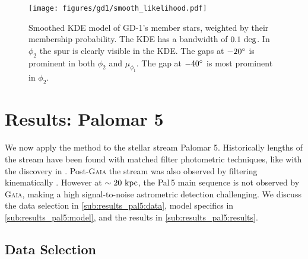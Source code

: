 \documentclass[twocolumn]{aastex631}
\newcommand{\code}[1]{\textsc{#1}}
\newcommand{\package}[1]{\code{#1}}
\newcommand{\stream}[1]{#1}
\begin{document}
        \begin{figure}[h]
            \centering
            \hspace{-25  pt}\texttt{[image: figures/gd1/smooth\_likelihood.pdf]}
            \caption{%
                Smoothed KDE model of \stream{GD-1}'s member stars, weighted by
                their membership probability. The KDE has a bandwidth of $0.1 \
                \rm{deg}$.  In $\phi_2$ the spur is clearly visible in the KDE.
                The gaps at $-20\degree$ is prominent in both $\phi_2$ and
                $\mu_{\phi_1}$.  The gap at $-40\degree$ is most prominent in
                $\phi_2$.
            }
            \label{fig:gd1-heatmap}
        \end{figure}



\section{Results: Palomar 5} \label{sec:results_pal5}

    We now apply the method to the stellar stream \stream{Palomar 5}.
    Historically lengths of the stream have been found with matched filter
    photometric techniques, like with the discovery in \citet{Odenkirchen+2001}.
    Post-\package{Gaia} the stream was also observed by filtering kinematically
    \cite[e.g.,][]{Starkman+2019, Ibata+2021}.  However at $\sim 20 \ \rm{kpc}$,
    the \stream{Pal\,5} main sequence is not observed by \package{Gaia}, making
    a high signal-to-noise astrometric detection challenging.
    We discuss the data selection in \autoref{sub:results_pal5:data}, model
    specifics in \autoref{sub:results_pal5:model}, and the results in
    \autoref{sub:results_pal5:results}.

    \subsection{Data Selection} \label{sub:results_pal5:data}
\end{document}
